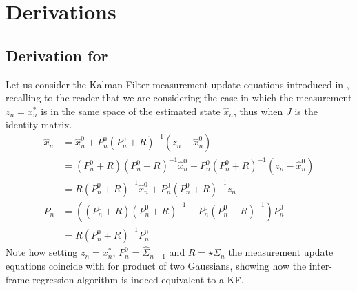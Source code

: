 
\section{Derivations}

\subsection{Derivation for }
\label{app:proof-kalman}
Let us consider the Kalman Filter measurement update equations introduced in , recalling to the reader that we are considering the case in which the measurement $z_n = x_n^*$ is in the same space of the estimated state $\hat{x}_n$, thus when $J$ is the identity matrix.
% 
\begin{align*}
\hat{x}_n 
&= \hat{x}_n^0 + P_n^0  (P_n^0 + R)^{-1}(z_n - \hat{x}_n^0) \\
&= (P_n^0 + R)(P_n^0 + R)^{-1}\hat{x}_n^0 + P_n^0  (P_n^0 + R)^{-1}(z_n - \hat{x}_n^0) \\
&= R(P_n^0 + R)^{-1}\hat{x}_n^0 + P_n^0  (P_n^0 + R)^{-1}z_n \\
% 
% 
P_n &= ((P_n^0 + R) (P_n^0 + R)^{-1} - P_n^0  (P_n^0 + R)^{-1}) P_n^0\\
&= R (P_n^0 + R)^{-1} P_n^0
\end{align*}
% 
Note how setting $z_n = x_n^*$, $P_n^0 = \hat{\Sigma}_{n - 1}$ and $R = \star\Sigma_{n}$ the measurement update equations coincide with  for product of two Gaussians, showing how the inter-frame regression algorithm is indeed equivalent to a KF.

